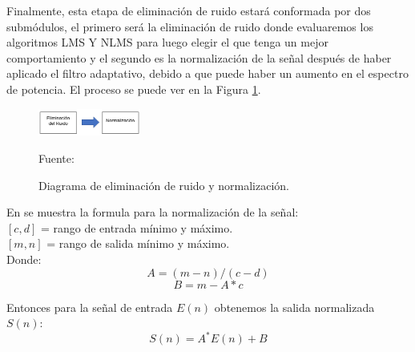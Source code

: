 \begin{enumerate}
\begin{enumerate}
Finalmente, esta etapa de eliminación de ruido estará conformada por dos submódulos, el primero será la eliminación de ruido donde evaluaremos los algoritmos LMS Y NLMS para luego elegir el que tenga un mejor comportamiento y el segundo es la normalización de la señal después de haber aplicado el filtro adaptativo, debido a que puede haber un aumento en el espectro de potencia. El proceso se puede ver en la Figura \ref{fig:figura2.24}.
\vskip 0.2cm
\begin{figure}[ht]
\begin{center}
\includegraphics[width=0.3\textwidth]{Imagenes/Cap2/image025}
\end{center}
\begin{center}
\vskip -0.5cm
\caption{\small{Diagrama de eliminación de ruido y normalización.}}
\label{fig:figura2.24}
{\small{Fuente: \citep{eyra}}}
\end{center}
\end{figure}
\newpage
En \cite{mathematics} se muestra la formula para la normalización de la señal:\\
$[c, d]$ = rango de entrada mínimo y máximo.\\
$[m, n]$ = rango de salida mínimo y máximo.\\
Donde:
\begin{equation}
\label{eq:ecuacion14}
A = (m-n)/(c-d)
\end{equation}
\vskip -1cm
\begin{equation}
\label{eq:ecuacion15}
B = m - A*c
\end{equation}

Entonces para la señal de entrada $E(n)$ obtenemos la salida normalizada $S(n)$:
\begin{equation}
\label{eq:ecuacion16}
S(n) = A^{*}E(n) + B
\end{equation}
\end{enumerate}


\end{enumerate}
